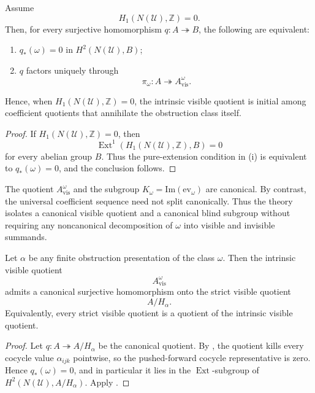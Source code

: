 \begin{corollary}\label{cor:h1-vanishing-class-trivializing}
Assume
\[
H_1(N(\mathcal U),\mathbb Z)=0.
\]
Then, for every surjective homomorphism $q:A\twoheadrightarrow B$, the following are equivalent:
\begin{enumerate}[label=(\roman*),nosep]
\item $q_*(\omega)=0$ in $H^2(N(\mathcal U),B)$;
\item $q$ factors uniquely through
\[
\pi_{\omega}:A\twoheadrightarrow A_{\mathrm{vis}}^{\omega}.
\]
\end{enumerate}
Hence, when $H_1(N(\mathcal U),\mathbb Z)=0$, the intrinsic visible quotient is initial among coefficient quotients that annihilate the obstruction class itself.
\end{corollary}

\begin{proof}
If $H_1(N(\mathcal U),\mathbb Z)=0$, then
\[
\operatorname{Ext}^1(H_1(N(\mathcal U),\mathbb Z),B)=0
\]
for every abelian group $B$. Thus the pure-extension condition in (i) is equivalent to $q_*(\omega)=0$, and the conclusion follows.
\end{proof}

\begin{remark}\label{rem:no-canonical-splitting}
The quotient $A_{\mathrm{vis}}^{\omega}$ and the subgroup $K_{\omega}=\mathrm{Im}(\mathrm{ev}_{\omega})$ are canonical. By contrast, the universal coefficient sequence need not split canonically. Thus the theory isolates a canonical visible quotient and a canonical blind subgroup without requiring any noncanonical decomposition of $\omega$ into visible and invisible summands.
\end{remark}

\begin{corollary}\label{cor:strict-to-intrinsic-visible}
Let $\alpha$ be any finite obstruction presentation of the class $\omega$. Then the intrinsic visible quotient
\[
A_{\mathrm{vis}}^{\omega}
\]
admits a canonical surjective homomorphism onto the strict visible quotient
\[
A/H_\alpha.
\]
Equivalently, every strict visible quotient is a quotient of the intrinsic visible quotient.
\end{corollary}

\begin{proof}
Let $q:A\twoheadrightarrow A/H_\alpha$ be the canonical quotient. By , the quotient kills every cocycle value $\alpha_{ijk}$ pointwise, so the pushed-forward cocycle representative is zero. Hence $q_*(\omega)=0$, and in particular it lies in the $\operatorname{Ext}$-subgroup of $H^2(N(\mathcal U),A/H_\alpha)$. Apply .
\end{proof}

